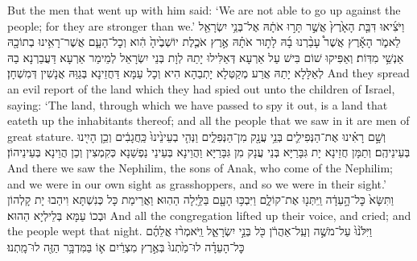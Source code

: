 {But the men that went up with him said: ‘We are not able to go up against the people; for they are stronger than we.’}{}
{וַיֹּצִ֜יאוּ דִּבַּ֤ת הָאָ֙רֶץ֙ אֲשֶׁ֣ר תָּר֣וּ אֹתָ֔הּ אֶל־בְּנֵ֥י יִשְׂרָאֵ֖ל לֵאמֹ֑ר הָאָ֡רֶץ אֲשֶׁר֩ עָבַ֨רְנוּ בָ֜הּ לָת֣וּר אֹתָ֗הּ אֶ֣רֶץ אֹכֶ֤לֶת יוֹשְׁבֶ֙יהָ֙ הִ֔וא וְכׇל־הָעָ֛ם אֲשֶׁר־רָאִ֥ינוּ בְתוֹכָ֖הּ אַנְשֵׁ֥י מִדּֽוֹת׃
}
{וְאַפִּיקוּ שׁוֹם בִּישׁ עַל אַרְעָא דְּאַלִּילוּ יָתַהּ לְוָת בְּנֵי יִשְׂרָאֵל לְמֵימַר אַרְעָא דַּעֲבַרְנָא בַהּ לְאַלָּלָא יָתַהּ אֲרַע מְקַטְּלָא יָתְבַהָא הִיא וְכָל עַמָּא דַּחֲזֵינָא בְּגַוַּהּ אֲנָשִׁין דְּמִשְׁחָן׃}
{And they spread an evil report of the land which they had spied out unto the children of Israel, saying: ‘The land, through which we have passed to spy it out, is a land that eateth up the inhabitants thereof; and all the people that we saw in it are men of great stature.}{}
{וְשָׁ֣ם רָאִ֗ינוּ אֶת־הַנְּפִילִ֛ים בְּנֵ֥י עֲנָ֖ק מִן־הַנְּפִלִ֑ים וַנְּהִ֤י בְעֵינֵ֙ינוּ֙ כַּֽחֲגָבִ֔ים וְכֵ֥ן הָיִ֖ינוּ בְּעֵינֵיהֶֽם׃
}
{וְתַמָּן חֲזֵינָא יָת גִּבָּרַיָּא בְּנֵי עֲנָק מִן גִּבָּרַיָּא וַהֲוֵינָא בְּעֵינֵי נַפְשַׁנָא כְּקִמְצִין וְכֵן הֲוֵינָא בְּעֵינֵיהוֹן׃}
{And there we saw the Nephilim, the sons of Anak, who come of the Nephilim; and we were in our own sight as grasshoppers, and so we were in their sight.’}{}
\newperek
{}%
{וַתִּשָּׂא֙ כׇּל־הָ֣עֵדָ֔ה וַֽיִּתְּנ֖וּ אֶת־קוֹלָ֑ם וַיִּבְכּ֥וּ הָעָ֖ם בַּלַּ֥יְלָה הַהֽוּא׃
}
{וַאֲרֵימַת כָּל כְּנִשְׁתָּא וִיהַבוּ יָת קָלְהוֹן וּבְכוֹ עַמָּא בְּלֵילְיָא הַהוּא׃}
{And all the congregation lifted up their voice, and cried; and the people wept that night.}{}
{וַיִּלֹּ֙נוּ֙ עַל־מֹשֶׁ֣ה וְעַֽל־אַהֲרֹ֔ן כֹּ֖ל בְּנֵ֣י יִשְׂרָאֵ֑ל וַֽיֹּאמְר֨וּ אֲלֵהֶ֜ם כׇּל־הָעֵדָ֗ה לוּ־מַ֙תְנוּ֙ בְּאֶ֣רֶץ מִצְרַ֔יִם א֛וֹ בַּמִּדְבָּ֥ר הַזֶּ֖ה לוּ־מָֽתְנוּ׃
}
